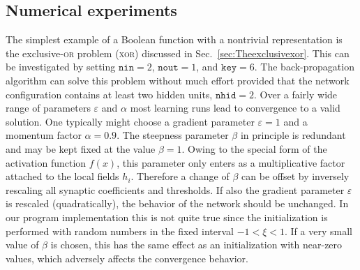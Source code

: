 \subsection{Numerical experiments}
The simplest example of a Boolean function with a nontrivial representation is the exclusive-\textsc{or} problem (\textsc{xor}) discussed in Sec.~\ref{sec:Theexclusivexor}. This can be investigated by setting $\texttt{nin}=2$, $\texttt{nout}=1$, and $\texttt{key}=6$. The back-propagation algorithm can solve this problem without much effort provided that the network configuration contains at least two hidden units, $\texttt{nhid}=2$. Over a fairly wide range of parameters $\varepsilon$ and $\alpha$ most learning runs lead to convergence to a valid solution. One typically might choose a gradient parameter $\varepsilon=1$ and a momentum factor $\alpha=0.9$. The steepness parameter $\beta$ in principle is redundant and may be kept fixed at the value $\beta=1$. Owing to the special form of the activation function $f(x)$, this parameter only enters as a multiplicative factor attached to the local fields $h_i$. Therefore a change of $\beta$ can be offset by inversely rescaling all synaptic coefficients and thresholds. If also the gradient parameter $\varepsilon$ is rescaled (quadratically), the behavior of the network should be unchanged. In our program implementation this is not quite true since the initialization is performed with random numbers in the fixed interval $-1<\xi<1$. If a very small value of $\beta$ is chosen, this has the same effect as an initialization with near-zero values, which adversely affects the convergence behavior.

